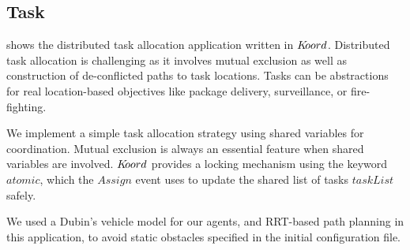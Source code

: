 \subsection{Task}

  shows the distributed task allocation application written in $K\kern-2pt oord$. Distributed task allocation is challenging as it involves mutual exclusion as well as construction of de-conflicted paths to task locations. Tasks can be abstractions for real location-based objectives like package delivery, surveillance, or fire-fighting. 

We implement a simple task allocation strategy using shared variables for coordination. Mutual exclusion is always an essential feature when shared variables are involved. $K\kern-2pt oord$ provides a locking mechanism using the keyword $\mathit{atomic}$, which the $\mathit{Assign}$ event uses to update the shared list of tasks $\mathit{taskList}$ safely. 

We used a Dubin's vehicle model for our agents, and RRT-based path planning in this application, to avoid static obstacles specified in the initial configuration file. 

